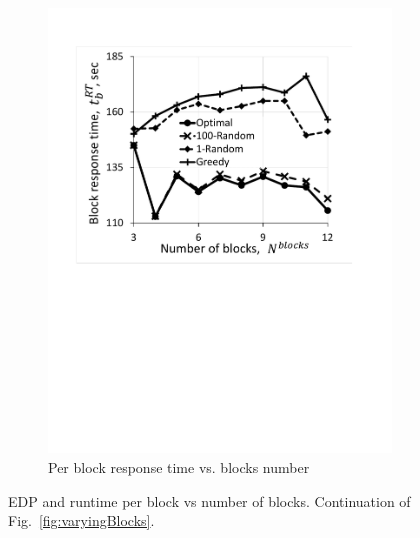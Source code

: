 \begin{figure}
\begin{subfigure}{0.4\textwidth}
        \includegraphics[width=\linewidth]{figs/BlockRTVsBlocks.pdf}
        \caption{Per block response time vs. blocks number}
        \label{fig:BlockRTVsBlocks}
    \end{subfigure}
    \caption{EDP and runtime per block vs number of blocks. Continuation of Fig.~\ref{fig:varyingBlocks}.}
\end{figure}



